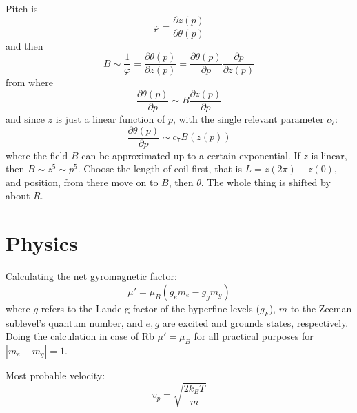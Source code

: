 \documentclass[10pt,a4paper]{article}
\begin{document}
Pitch is
\begin{equation}
\varphi = \frac{\partial z(p)}{\partial \theta(p)}
\end{equation}
and then
\begin{equation}
B \sim \frac{1}{\varphi} = \frac{\partial \theta(p)}{\partial z(p)} = 
  \frac{\partial \theta(p)}{\partial p}\frac{\partial p}{\partial z(p)}	
\end{equation}
from where 
\begin{equation}
\frac{\partial \theta(p)}{\partial p} \sim B \frac{\partial z(p)}{\partial p}	
\end{equation}
and since $z$ is just a linear function of $p$, with the single relevant parameter $c_7$:
\begin{equation}
\frac{\partial \theta(p)}{\partial p} \sim c_7 B(z(p))
\end{equation}
where the field $B$ can be approximated up to a certain exponential. If $z$ is linear, then $B \sim z^5 \sim p^5$. Choose the length of coil first, that is $L = z(2\pi) - z(0)$,  and position, from there move on to $B$, then $\theta$. The whole thing is shifted by about $R$.


\section{Physics}

Calculating the net gyromagnetic factor:
\begin{equation}
\mu' = \mu_B \left(g_e m_e - g_g m_g\right)
\end{equation}
where $g$ refers to the Lande g-factor of the hyperfine levels ($g_F$), $m$ to the Zeeman sublevel's quantum number, and $e,g$ are excited and grounds states, respectively. Doing the calculation in case of Rb $\mu' = \mu_B$ for all practical purposes for $|m_e - m_g| = 1$.

Most probable velocity:
\begin{equation}
v_p = \sqrt{\frac{2 k_B T}{m}}
\end{equation}


\end{document}
